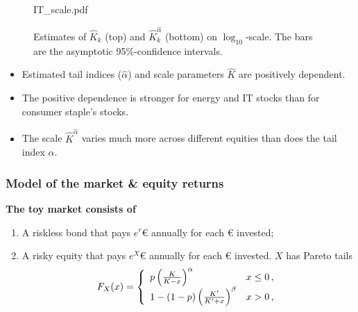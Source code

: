 \documentclass{beamer}
\begin{document}
\begin{frame}
\begin{minipage}{0.65\linewidth}
\begin{figure}[htb!]
\begin{minipage}{0.33\linewidth}
    {IT_scale.pdf}
  \end{minipage}
    \caption{\scriptsize Estimates of $\hat K_k$ (top) and
      $\hat K_k^{\hat \alpha}$ (bottom) on $\log_{10}$-scale.
      The bars are the asymptotic 95\%-confidence intervals.
    }
    \label{fig:sectors_parameters}
  \end{figure}
  \end{minipage}\hfill
  \begin{minipage}{0.35\linewidth}
    \begin{footnotesize}
      \begin{itemize}
      \item Estimated tail indices ($\hat \alpha$) and scale parameters
        $\hat K$ are positively dependent.
      \item The positive dependence is stronger for energy and IT stocks
        than for consumer staple's stocks.
      \item The scale $\hat K^{\hat \alpha}$ varies much more across different
        equities than does the tail index $\alpha$.
      \end{itemize}
    \end{footnotesize}
  \end{minipage}
\end{frame}

\begin{frame}
  \frametitle{Model of the market \& equity returns}
  \textcolor[HTML]{990033}{\bf The toy market consists of}
  \begin{enumerate}
  \item A riskless bond that pays $e^r$€ annually for each € invested;
  \item A risky equity that pays $e^X$€ annually for each € invested.
    $X$ has Pareto tails
    \[
    F_X(x) = \left\{
      \begin{array}{ll}
        p \left(
          {K \over K - x}
        \right)^\alpha & x \leq 0 \,,\\
        1 - (1 - p) \left(
          {K' \over K' + x}
        \right)^\beta & x > 0\,,
      \end{array}
    \right.
    \]
  \end{enumerate}
\end{frame}
\end{document}
